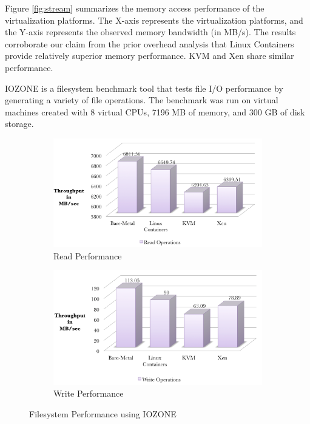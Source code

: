 Figure \ref{fig:stream} summarizes the memory access performance of the virtualization platforms. The X-axis represents the virtualization platforms, and the Y-axis represents the observed memory bandwidth (in MB/s). The results corroborate our claim from the prior overhead analysis that Linux Containers provide relatively superior memory performance. KVM and Xen share similar performance. 


IOZONE is a filesystem benchmark tool that tests file I/O performance by generating a variety of file operations. The benchmark was run on virtual machines created with 8 virtual CPUs, 7196 MB of memory, and 300 GB of disk storage.

\begin{figure}[H]
        \centering
        \begin{subfigure}[b]{0.99\textwidth}
                \includegraphics[width=\textwidth]{iozone_read.png}
                \caption{Read Performance}
                \label{fig:iozoneread}
        \end{subfigure}%
        \qquad \newline %
        \begin{subfigure}[b]{0.8\textwidth}
                \includegraphics[width=\textwidth]{iozone_write.png}
                \caption{Write Performance}
                \label{fig:iozonewrite}
        \end{subfigure}
        \caption{Filesystem Performance using IOZONE}\label{fig:iozone}
\end{figure}

